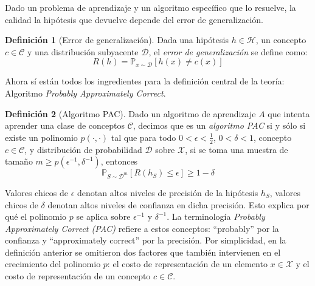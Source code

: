 \documentclass{article}
\theoremstyle{definition}
\newtheorem{definition}{Definici\'on}%
\begin{document}
\begin{center}
\end{center}

Dado un problema de aprendizaje y un algoritmo espec\'ifico que lo resuelve, la calidad la hip\'otesis que devuelve depende del error de generalizaci\'on.

\begin{definition}[Error de generalizaci\'on]
    Dada una hip\'otesis $h \in \mathcal{H}$, un concepto $c \in \mathcal{C}$ y una distribuci\'on subyacente $\mathcal{D}$, el \emph{error de generalizaci\'on} se define como: 
    $$
    R(h) = \mathbb{P}_{x \sim \mathcal{D}}[h(x) \neq c(x)]
    $$
\end{definition}

Ahora s\'i est\'an todos los ingredientes para la definici\'on central de la teor\'ia: Algoritmo \emph{Probably Approximately Correct}.

\begin{definition}[Algoritmo PAC]
    \label{def:pac}
    Dado un algoritmo de aprendizaje $A$ que intenta aprender una clase de conceptos $\mathcal{C}$, decimos que es un \emph{algoritmo PAC} si y s\'olo si existe un polinomio $p(\cdot, \cdot)$ tal que para todo $0 < \epsilon < \frac{1}{2}$, $0 < \delta < 1$, concepto $c \in \mathcal{C}$, y distribuci\'on de probabilidad $\mathcal{D}$ sobre $\mathcal{X}$, si se toma una muestra de tama\~no $m \geq p(\epsilon^{-1}, \delta^{-1})$, entonces
    $$
    \mathbb{P}_{S\sim\mathcal{D}^m}[R(h_S) \leq \epsilon] \geq 1 - \delta
    $$
\end{definition}

Valores chicos de $\epsilon$ denotan altos niveles de precisi\'on de la hip\'otesis $h_S$, valores chicos de $\delta$ denotan altos niveles de confianza en dicha precisi\'on. Esto explica por qu\'e el polinomio $p$ se aplica sobre $\epsilon^{-1}$ y $\delta^{-1}$. La terminolog\'ia \emph{Probably Approximately Correct (PAC)} refiere a estos conceptos: ``probably'' por la confianza y ``approximately correct'' por la precisi\'on.
Por simplicidad, en la definici\'on anterior se omitieron dos factores que tambi\'en intervienen en el crecimiento del polinomio $p$: el costo de representaci\'on de un elemento $x \in \mathcal{X}$ y el costo de representaci\'on de un concepto $c \in \mathcal{C}$.
\end{document}
